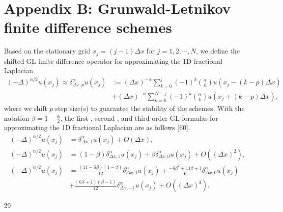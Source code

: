 \documentclass[UTF8]{article}
\begin{document}
\section*{Appendix B: Grunwald-Letnikov finite difference schemes}

Based on the stationary grid $x_j = (j-1)\Delta x$ for $j=1, 2, \cdots, N$, we define the shifted GL finite difference operator for approximating the 1D fractional Laplacian
\begin{equation}
\begin{aligned}
(-\Delta)^{\alpha/2} u(x_j) \approx \delta_{\Delta x, p}^\alpha u(x_j) &:= (\Delta x)^{-\alpha} \sum_{k=0}^j (-1)^k \binom{\alpha}{k} u(x_j - (k-p)\Delta x) \\
&+ (\Delta x)^{-\alpha} \sum_{k=0}^{N-j} (-1)^k \binom{\alpha}{k} u(x_j + (k-p)\Delta x),
\end{aligned} \tag{A.3}
\end{equation}
where we shift $p$ step size(s) to guarantee the stability of the schemes. With the notation $\beta = 1 - \frac{\alpha}{2}$, the first-, second-, and third-order GL formulas for approximating the 1D fractional Laplacian are as follows [60].
\begin{equation}
\begin{aligned}
(-\Delta)^{\alpha/2} u(x_j) &= \delta_{\Delta x, 1}^\alpha u(x_j) + O(\Delta x), \\
(-\Delta)^{\alpha/2} u(x_j) &= (1-\beta) \delta_{\Delta x, 1}^\alpha u(x_j) + \beta \delta_{\Delta x, 0}^\alpha u(x_j) + O((\Delta x)^2), \\
(-\Delta)^{\alpha/2} u(x_j) &= \frac{(11-6\beta)(1-\beta)}{12} \delta_{\Delta x, 1}^\alpha u(x_j) + \frac{-6\beta^2 + 11\beta + 1}{6} \delta_{\Delta x, 0}^\alpha u(x_j) \\
&+ \frac{(6\beta+1)(\beta-1)}{12} \delta_{\Delta x, -1}^\alpha u(x_j) + O((\Delta x)^3).
\end{aligned} \tag{A.4}
\end{equation}

\vfill
29
\end{document}
